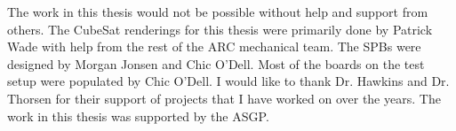 
The work in this thesis would not be possible without help and support from others. The CubeSat renderings for this thesis were primarily done by Patrick Wade with help from the rest of the \acs{ARC} mechanical team. The \aclp{SPB} were designed by Morgan Jonsen and Chic O'Dell. Most of the boards on the test setup were populated by Chic O'Dell. I would like to thank Dr. Hawkins and Dr. Thorsen for their support of projects that I have worked on over the years. The work in this thesis was supported by the \acl{ASGP}.


